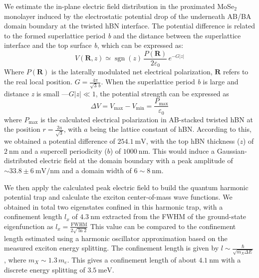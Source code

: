 We estimate the in-plane electric field distribution in the proximated MoSe$_2$ monolayer induced by the electrostatic potential drop of the underneath AB/BA domain boundary at the twisted hBN interface. 
The potential difference is related to the formed superlattice period \textit{b} and the distance between the superlattice interface and the top surface \textit{b}, which can be expressed as\cite{Zhao2021-cm}:
\begin{equation}
V(\mathbf{R}, z) \simeq \operatorname{sgn}(z)\,
\frac{P(\mathbf{R})}{2 \varepsilon_{0}}\,
e^{-G|z|}
\end{equation}
Where $P(\mathbf{R})$ is the laterally modulated net electrical polarization, $\mathbf{R}$ refers to the real local position. 
$G = \frac{4\pi}{\sqrt{3}\,b}$. 
When the superlattice period \textit{b} is large and distance \textit{z} is small ---$G|z| \ll 1$, the potential strength can be expressed as
\begin{equation}
\Delta V = V_{\max} - V_{\min} = \frac{P_{\max}}{\varepsilon_{0}}
\label{eq:potential_strength}
\end{equation}
where $P_{\max}$ is the calculated electrical polarization in AB-stacked twisted hBN at the position $r = \tfrac{2a}{\sqrt{3}}$, with $a$ being the lattice constant of hBN.
According to this, we obtained a potential difference of $254.1~\text{mV}$, with the top hBN thickness ($z$) of $2~\text{nm}$ and a supercell periodicity ($b$) of $1000~\text{nm}$. 
This would induce a Gaussian-distributed electric field at the domain boundary with a peak amplitude of $\sim 33.8 \pm 6~\text{mV}/\text{nm}$ and a domain width of $6 \sim 8~\text{nm}$.

We then apply the calculated peak electric field to build the quantum harmonic potential trap and calculate the exciton center-of-mass wave functions. 
We obtained in total two eigenstates confined in this harmonic trap, with a confinement length $l_x$ of $4.3~\text{nm}$ extracted 
from the FWHM of the ground-state eigenfunction as
$l_x = \frac{\mathrm{FWHM}}{2\sqrt{\ln 2}}$
This value can be compared to the confinement length estimated using a harmonic oscillator approximation based on the measured exciton energy splitting. 
The confinement length is given by $l \sim \frac{\hbar}{\sqrt{m_X \Delta E}}$, where $m_X \sim 1.3\,m_e$. This gives a confinement length of about $4.1~\text{nm}$ with a discrete energy splitting of $3.5~\text{meV}$.

